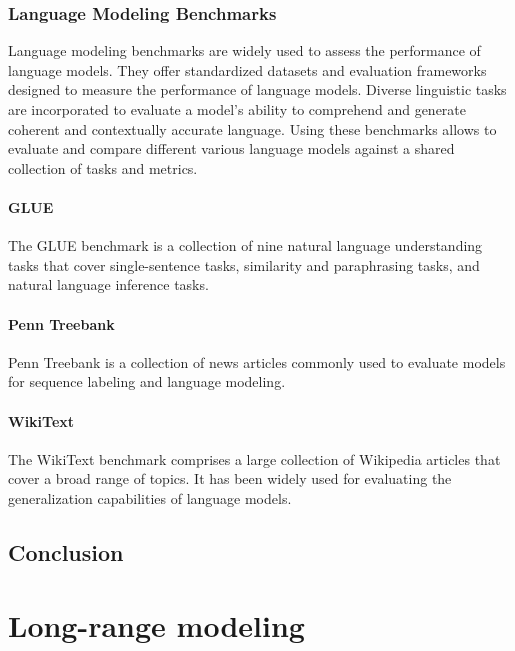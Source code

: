 \subsubsection{Language Modeling Benchmarks}

Language modeling benchmarks are widely used to assess the performance of language models. They offer standardized datasets and evaluation frameworks designed to measure the performance of language models. Diverse linguistic tasks are incorporated to evaluate a model's ability to comprehend and generate coherent and contextually accurate language. Using these benchmarks allows to evaluate and compare different various language models against a shared collection of tasks and metrics.

\paragraph{GLUE} The \ac{GLUE} benchmark is a collection of nine natural language understanding tasks that cover single-sentence tasks, similarity and paraphrasing tasks, and natural language inference tasks.

\paragraph{Penn Treebank} Penn Treebank \citep{marcus1993building} is a collection of news articles commonly used to evaluate models for sequence labeling and language modeling.

\paragraph{WikiText} The WikiText benchmark \citep{merity2016pointer} comprises a large collection of Wikipedia articles that cover a broad range of topics. It has been widely used for evaluating the generalization capabilities of language models.

\subsection{Conclusion}


\section{Long-range modeling}

